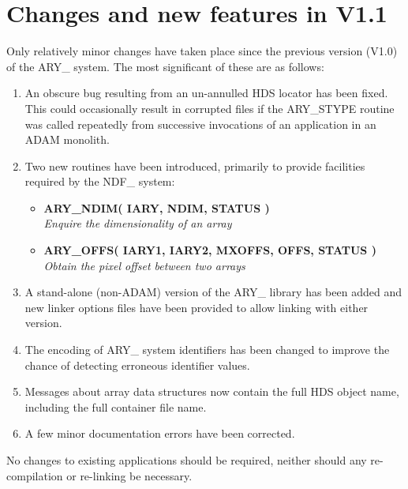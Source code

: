 \documentclass[twoside,11pt]{article}
\newcommand{\xlabel}[1]{}
\newcommand{\noteroutine}[2]{\textbf{#1}\hspace*{\fill}\nopagebreak \\
                             \hspace*{3em}\emph{#2}\hspace*{\fill}\par}
\begin{document}
\newpage
\section{\xlabel{changes_and_new_features_in_v11}%
Changes and new features in V1.1}
\label{changes_and_new_features_in_v11}

Only relatively minor changes have taken place since the previous
version (V1.0) of the ARY\_ system.  The most significant of these are
as follows:

\begin{enumerate}

\item An obscure bug resulting from an un-annulled HDS locator has been
fixed.  This could occasionally result in corrupted files if the
ARY\_STYPE routine was called repeatedly from successive invocations of
an application in an ADAM monolith.

\item Two new routines have been introduced, primarily to provide facilities 
required by the NDF\_ system:

\begin{itemize}

\item \noteroutine{ARY\_NDIM( IARY, NDIM, STATUS )}
                  {Enquire the dimensionality of an array}

\item \noteroutine{ARY\_OFFS( IARY1, IARY2, MXOFFS, OFFS, STATUS )}
                  {Obtain the pixel offset between two arrays}

\end{itemize}

\item A stand-alone (non-ADAM) version of the ARY\_ library has been
added and new linker options files have been provided to allow linking
with either version.

\item The encoding of ARY\_ system identifiers has been changed to
improve the chance of detecting erroneous identifier values.

\item Messages about array data structures now contain the full HDS object 
name, including the full container file name.

\item A few minor documentation errors have been corrected.

\end{enumerate}

No changes to existing applications should be required, neither should any 
re-compilation or re-linking be necessary.

\end{document}
